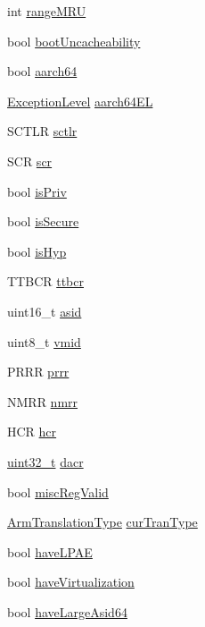 \begin{DoxyCompactItemize}
\item 
int \hyperlink{classArmISA_1_1TLB_a7450c3dc2cffd22401a23ddc29b0c036}{rangeMRU}
\item 
bool \hyperlink{classArmISA_1_1TLB_a2ebef8e3741ddc1169a0a05e6a48052e}{bootUncacheability}
\item 
bool \hyperlink{classArmISA_1_1TLB_a52c06c8a54293998f3e1f71cdbd916f7}{aarch64}
\item 
\hyperlink{namespaceArmISA_a16588a7a92eb985c3341b7f706c81dd5}{ExceptionLevel} \hyperlink{classArmISA_1_1TLB_a658ce290954a428d8c5df11b8b5bd81b}{aarch64EL}
\item 
SCTLR \hyperlink{classArmISA_1_1TLB_a43c4d132ca97c6cc5358f7be3c2b5a69}{sctlr}
\item 
SCR \hyperlink{classArmISA_1_1TLB_ace0bf26677706ecff809bd4c76d33c8c}{scr}
\item 
bool \hyperlink{classArmISA_1_1TLB_ae5a4adef864b3b2b23001750a8a89499}{isPriv}
\item 
bool \hyperlink{classArmISA_1_1TLB_a62bc84f4251f16cf0cfa0f8d96e00c37}{isSecure}
\item 
bool \hyperlink{classArmISA_1_1TLB_a104c09577173edc4f8ce6814cc33f0ae}{isHyp}
\item 
TTBCR \hyperlink{classArmISA_1_1TLB_ad6762be565087b4bfb87f5bcb42673e7}{ttbcr}
\item 
uint16\_\-t \hyperlink{classArmISA_1_1TLB_a984a2dcfd9509ab586bee117bb2a7cfb}{asid}
\item 
uint8\_\-t \hyperlink{classArmISA_1_1TLB_add293169f7f2ac526b3fa14f950cf0bb}{vmid}
\item 
PRRR \hyperlink{classArmISA_1_1TLB_a06fc88abc8a8aa441c512ebb7531b3d7}{prrr}
\item 
NMRR \hyperlink{classArmISA_1_1TLB_a763ad3cda6c2782d46835a3b2c4b5515}{nmrr}
\item 
HCR \hyperlink{classArmISA_1_1TLB_ad0d8df2e2be956266458221c23763b4c}{hcr}
\item 
\hyperlink{Type_8hh_a435d1572bf3f880d55459d9805097f62}{uint32\_\-t} \hyperlink{classArmISA_1_1TLB_a9d6f500564b7a3bf1ded6bc18b3d47db}{dacr}
\item 
bool \hyperlink{classArmISA_1_1TLB_ab11476fda4a6785ee0b6096e2e50f30c}{miscRegValid}
\item 
\hyperlink{classArmISA_1_1TLB_ad6f5d480df151d5bddeefc6271793f08}{ArmTranslationType} \hyperlink{classArmISA_1_1TLB_a23a689868acc5917efd41d7477757059}{curTranType}
\item 
bool \hyperlink{classArmISA_1_1TLB_a8e8469d916956ca8b9052ebd6f155e0b}{haveLPAE}
\item 
bool \hyperlink{classArmISA_1_1TLB_a48e6871d9ab14ff31b50307f0c617f95}{haveVirtualization}
\item 
bool \hyperlink{classArmISA_1_1TLB_a3aea18414c83c86fa366401cb767e7ab}{haveLargeAsid64}
\end{DoxyCompactItemize}
